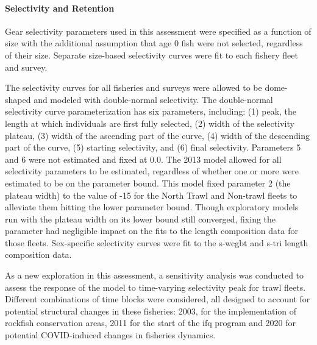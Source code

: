 \documentclass[11pt,
  english,
  letterpaper,
]{article}
\begin{document}
\hypertarget{selectivity-and-retention}{%
\paragraph{Selectivity and Retention}\label{selectivity-and-retention}}

Gear selectivity parameters used in this assessment were specified as a function of size with the additional assumption that age 0 fish were not selected, regardless of their size. Separate size-based selectivity curves were fit to each fishery fleet and survey.

The selectivity curves for all fisheries and surveys were allowed to be dome-shaped and modeled with double-normal selectivity. The double-normal selectivity curve parameterization has six parameters, including: (1) peak, the length at which individuals are first fully selected, (2) width of the selectivity plateau, (3) width of the ascending part of the curve, (4) width of the descending part of the curve, (5) starting selectivity, and (6) final selectivity. Parameters 5 and 6 were not estimated and fixed at 0.0. The 2013 model allowed for all selectivity parameters to be estimated, regardless of whether one or more were estimated to be on the parameter bound. This model fixed parameter 2 (the plateau width) to the value of -15 for the North Trawl and Non-trawl fleets to alleviate them hitting the lower parameter bound. Though exploratory models run with the plateau width on its lower bound still converged, fixing the parameter had negligible impact on the fits to the length composition data for those fleets. Sex-specific selectivity curves were fit to the \gls{s-wcgbt} and \gls{s-tri} length composition data.

As a new exploration in this assessment, a sensitivity analysis was conducted to assess the response of the model to time-varying selectivity peak for trawl fleets. Different combinations of time blocks were considered, all designed to account for potential structural changes in these fisheries: 2003, for the implementation of rockfish conservation areas, 2011 for the start of the \gls{ifq} program and 2020 for potential COVID-induced changes in fisheries dynamics.
\end{document}
